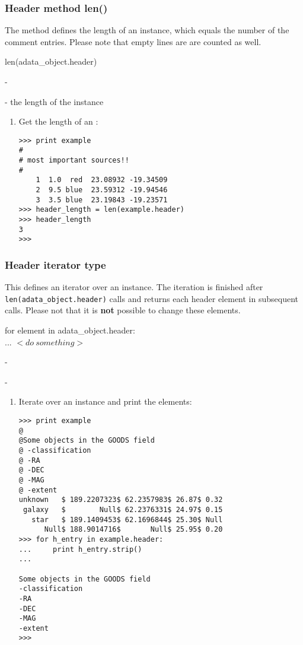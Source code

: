 \subsubsection{Header method len()}
\label{ahe_len}
%
The method defines the length of an \ah instance, which
equals the number of the comment entries. Please note that
empty lines are are counted as well.

len(adata\_object.header)

-

- the length of the \ah instance

\begin{enumerate}
\item Get the length of an \ah:
\begin{small}
\begin{verbatim}
>>> print example
#
# most important sources!!
#
    1  1.0  red  23.08932 -19.34509
    2  9.5 blue  23.59312 -19.94546
    3  3.5 blue  23.19843 -19.23571
>>> header_length = len(example.header)
>>> header_length
3
>>>
\end{verbatim}
\end{small}
\end{enumerate}


\subsubsection{Header iterator type}
\label{ahe_iterator}
%
This defines an iterator over an \ah instance. The iteration is finished after
{\tt len(adata\_object.header)} calls and returns each header element
in subsequent calls. Please not that it is {\bf not} possible to change these
elements.

for element in adata\_object.header:\\
... $<do\ something>$

-

-

\begin{enumerate}
\item Iterate over an \ah instance and print the elements:
\begin{small}
\begin{verbatim}
>>> print example
@
@Some objects in the GOODS field
@ -classification
@ -RA
@ -DEC
@ -MAG
@ -extent
unknown   $ 189.2207323$ 62.2357983$ 26.87$ 0.32
 galaxy   $        Null$ 62.2376331$ 24.97$ 0.15
   star   $ 189.1409453$ 62.1696844$ 25.30$ Null
      Null$ 188.9014716$       Null$ 25.95$ 0.20
>>> for h_entry in example.header:
...     print h_entry.strip()
...

Some objects in the GOODS field
-classification
-RA
-DEC
-MAG
-extent
>>>

\end{verbatim}
\end{small}
\end{enumerate}


